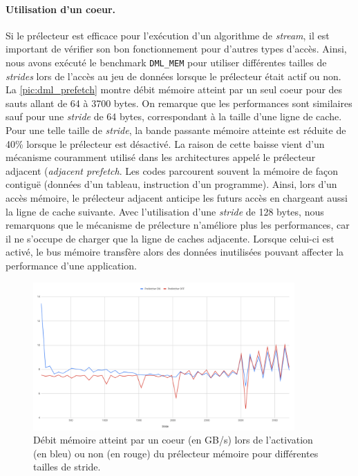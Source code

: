         \paragraph{Utilisation d'un coeur.}
            Si le prélecteur est efficace pour l'exécution d'un algorithme de \textit{stream}, il est important de vérifier son bon fonctionnement pour d'autres types d'accès. Ainsi, nous avons exécuté le benchmark \verb=DML_MEM= pour utiliser différentes tailles de \textit{strides} lors de l'accès au jeu de données lorsque le prélecteur était actif ou non. La \autoref{pic:dml_prefetch} montre débit mémoire atteint par un seul coeur  pour des sauts allant de 64 à 3700 bytes. On remarque que les performances sont similaires sauf pour une \textit{stride} de 64 bytes, correspondant à la taille d'une ligne de cache. Pour une telle taille de \textit{stride}, la bande passante mémoire atteinte est réduite de 40\% lorsque le prélecteur est désactivé. La raison de cette baisse vient d'un mécanisme couramment utilisé dans les architectures appelé le prélecteur adjacent (\textit{adjacent prefetch}. Les codes parcourent souvent la mémoire de façon contiguë (données d'un tableau, instruction d'un programme). Ainsi, lors d'un accès mémoire, le prélecteur adjacent anticipe les futurs accès en chargeant aussi la ligne de cache suivante. Avec l'utilisation d'une \textit{stride} de 128 bytes, nous remarquons que le mécanisme de prélecture n'améliore plus les performances, car il ne s'occupe de charger que la ligne de caches adjacente. Lorsque celui-ci est activé, le bus mémoire transfère alors des données inutilisées pouvant affecter la performance d'une application.
            
            
        
        \begin{figure}
        \center
        \includegraphics[width=10cm]{images/dml_prefetch.png}
        \caption{\label{pic:dml_prefetch} Débit mémoire atteint par un coeur (en GB/s) lors de l'activation (en bleu) ou non (en rouge) du prélecteur mémoire pour différentes tailles de stride. }
        \end{figure}
        
